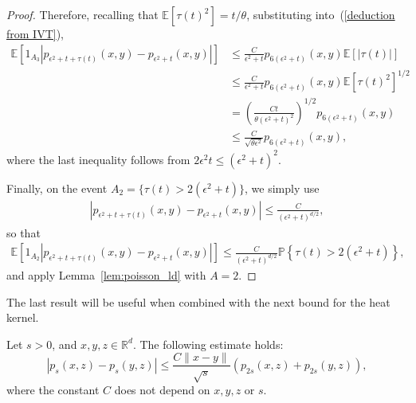 \documentclass[EJP]{ejpecp} %
\newcommand{\IP}{\mathbb P}
\newcommand{\IE}{\mathbb E}
\newcommand{\IR}{\mathbb R}
\begin{document}
\begin{proof}
    Therefore, recalling that $\IE[\tau(t)^2] = t / \theta$, substituting 
into~(\ref{deduction from IVT}),
    \begin{align*}
        \IE\left[
            1_{A_3}
            \left|
                p_{\epsilon^2 + t + \tau(t)}(x, y)
                -
                p_{\epsilon^2 + t}(x, y)
            \right|
        \right]
        &\le
            \frac{C}{\epsilon^2 + t}
                p_{6(\epsilon^2 + t)}(x, y)
            \IE\left[|\tau(t)|\right]
        \\ &\le
            \frac{C}{\epsilon^2 + t}
                p_{6(\epsilon^2 + t)}(x, y)
            \IE\left[\tau(t)^2\right]^{1/2}
        \\ &=
            \left( \frac{Ct}{\theta(\epsilon^2 + t)^2} \right)^{1/2}
                p_{6(\epsilon^2 + t)}(x, y)
        \\ &\le
            \frac{C}{\sqrt{\theta \epsilon^2}}
                p_{6(\epsilon^2 + t)}(x, y) ,
    \end{align*}
    where the last inequality follows from $2 \epsilon^2 t \le (\epsilon^2 + t)^2$.

    Finally, on the event $A_2 = \{\tau(t) > 2(\epsilon^2 + t)\}$,
    we simply use
    \begin{align*}
        \left|
            p_{\epsilon^2 + t + \tau(t)}(x, y)
            -
            p_{\epsilon^2 + t}(x, y)
        \right|
        \le
        \frac{C}{(\epsilon^2 + t)^{d/2}} ,
    \end{align*}
    so that
    \begin{align*}
        \IE\left[
        1_{A_2}
        \left|
            p_{\epsilon^2 + t + \tau(t)}(x, y)
            -
            p_{\epsilon^2 + t}(x, y)
        \right|
        \right]
        \le
        \frac{C}{(\epsilon^2 + t)^{d/2}}
        \IP\left\{
            \tau(t) > 2 (\epsilon^2 + t)
        \right\} ,
    \end{align*}
    and apply Lemma~\ref{lem:poisson_ld}
    with $A=2$.
\end{proof}

The last result will be useful when combined with the next bound for the heat kernel.

\begin{lemma}
    \label{Lemma:ContinuityHS}
Let $s>0$, and $x, y, z\in \IR^d$. The following estimate holds:
\[
    |p_s(x,z) - p_s(y,z)|
    \leq
    \frac{C\|x-y\|}{\sqrt{s}} \left(p_{2s}(x,z) + p_{2s}(y,z)\right) ,
\]
where the constant $C$ does not depend on $x,y,z$ or $s$.
\end{lemma}
\end{document}
